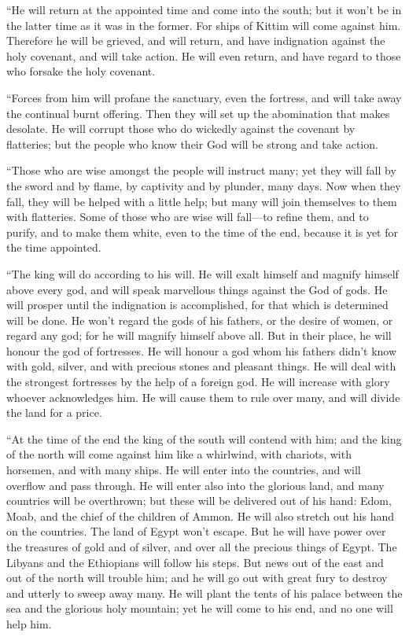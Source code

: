  ``He will return at the appointed time and come into the
south; but it won't be in the latter time as it was in the former.
 For ships of Kittim will come against him. Therefore he
will be grieved, and will return, and have indignation against the holy
covenant, and will take action. He will even return, and have regard to
those who forsake the holy covenant.

 ``Forces from him will profane the sanctuary, even the
fortress, and will take away the continual burnt offering. Then they
will set up the abomination that makes desolate.  He will
corrupt those who do wickedly against the covenant by flatteries; but
the people who know their God will be strong and take action.

 ``Those who are wise amongst the people will instruct
many; yet they will fall by the sword and by flame, by captivity and by
plunder, many days.  Now when they fall, they will be
helped with a little help; but many will join themselves to them with
flatteries.  Some of those who are wise will fall---to
refine them, and to purify, and to make them white, even to the time of
the end, because it is yet for the time appointed.

 ``The king will do according to his will. He will exalt
himself and magnify himself above every god, and will speak marvellous
things against the God of gods. He will prosper until the indignation is
accomplished, for that which is determined will be done. 
He won't regard the gods of his fathers, or the desire of women, or
regard any god; for he will magnify himself above all. 
But in their place, he will honour the god of fortresses. He will honour
a god whom his fathers didn't know with gold, silver, and with precious
stones and pleasant things.  He will deal with the
strongest fortresses by the help of a foreign god. He will increase with
glory whoever acknowledges him. He will cause them to rule over many,
and will divide the land for a price.

 ``At the time of the end the king of the south will
contend with him; and the king of the north will come against him like a
whirlwind, with chariots, with horsemen, and with many ships. He will
enter into the countries, and will overflow and pass through.
 He will enter also into the glorious land, and many
countries will be overthrown; but these will be delivered out of his
hand: Edom, Moab, and the chief of the children of Ammon.
 He will also stretch out his hand on the countries. The
land of Egypt won't escape.  But he will have power over
the treasures of gold and of silver, and over all the precious things of
Egypt. The Libyans and the Ethiopians will follow his steps.
 But news out of the east and out of the north will
trouble him; and he will go out with great fury to destroy and utterly
to sweep away many.  He will plant the tents of his
palace between the sea and the glorious holy mountain; yet he will come
to his end, and no one will help him.

